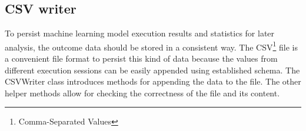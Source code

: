 \subsection{CSV writer}\label{subsec:csv-writer}
To persist machine learning model execution results and statistics for later analysis, the outcome data should be stored in a consistent way.
The CSV\footnote{Comma-Separated Values} file is a convenient file format to persist this kind of data because the values from different execution sessions can be easily appended using established schema.
The CSVWriter class introduces methods for appending the data to the file. The other helper methods allow for checking the correctness of the file and its content.
